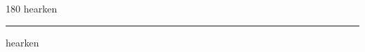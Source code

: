 
\begin{frame}
\begin{center}
\begin{turn}{180}
{\fontsize{2.5cm}{1em}\selectfont hearken}
\end{turn}
\vspace{1em}\par  
\hrule
\vspace{1em}\par  
{\fontsize{2.5cm}{1em}\selectfont hearken}
\end{center}
\end{frame}
